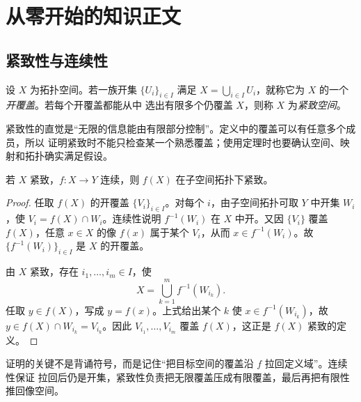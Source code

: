 \section{从零开始的知识正文}
\label{sec:foundations}

\subsection{紧致性与连续性}
\label{sec:compactness}

\begin{definition}
设 \(X\) 为拓扑空间。若一族开集 \(\{U_i\}_{i\in I}\) 满足
\(X=\bigcup_{i\in I}U_i\)，就称它为 \(X\) 的一个\emph{开覆盖}。若每个开覆盖都能从中
选出有限多个仍覆盖 \(X\)，则称 \(X\) 为\emph{紧致空间}。
\end{definition}

紧致性的直觉是“无限的信息能由有限部分控制”。定义中的覆盖可以有任意多个成员，所以
证明紧致时不能只检查某一个熟悉覆盖；使用定理时也要确认空间、映射和拓扑确实满足假设。

\begin{theorem}[连续像保持紧致]
\label{thm:compact-image}
若 \(X\) 紧致，\(f:X\to Y\) 连续，则 \(f(X)\) 在子空间拓扑下紧致。
\end{theorem}

\begin{proof}
任取 \(f(X)\) 的开覆盖 \(\{V_i\}_{i\in I}\)。对每个 \(i\)，由子空间拓扑可取
\(Y\) 中开集 \(W_i\)，使 \(V_i=f(X)\cap W_i\)。连续性说明
\(f^{-1}(W_i)\) 在 \(X\) 中开。又因 \(\{V_i\}\) 覆盖 \(f(X)\)，任意 \(x\in X\)
的像 \(f(x)\) 属于某个 \(V_i\)，从而 \(x\in f^{-1}(W_i)\)。故
\(\{f^{-1}(W_i)\}_{i\in I}\) 是 \(X\) 的开覆盖。

由 \(X\) 紧致，存在 \(i_1,\dots,i_m\in I\)，使
\[
  X=\bigcup_{k=1}^{m}f^{-1}(W_{i_k}).
\]
任取 \(y\in f(X)\)，写成 \(y=f(x)\)。上式给出某个 \(k\) 使
\(x\in f^{-1}(W_{i_k})\)，故 \(y\in f(X)\cap W_{i_k}=V_{i_k}\)。因此
\(V_{i_1},\dots,V_{i_m}\) 覆盖 \(f(X)\)，这正是 \(f(X)\) 紧致的定义。
\end{proof}

证明的关键不是背诵符号，而是记住“把目标空间的覆盖沿 \(f\) 拉回定义域”。连续性保证
拉回后仍是开集，紧致性负责把无限覆盖压成有限覆盖，最后再把有限性推回像空间。

